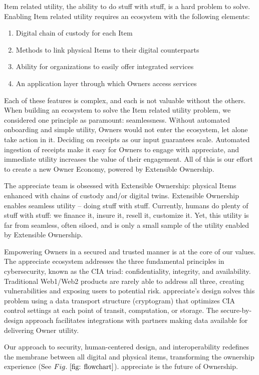 \documentclass[a4paper,onecolumn, 10.5pt]{article}
\begin{document}
Item related utility, the ability to do stuff with stuff, is a hard problem to solve. Enabling Item related utility requires an ecosystem with the following elements:
\begin{enumerate}
	\item Digital chain of custody for each Item
	\item Methods to link physical Items to their digital counterparts
	\item Ability for organizations to easily offer integrated services
	\item An application layer through which Owners access services
\end{enumerate}

Each of these features is complex, and each is not valuable without the others. When building an ecosystem to solve the Item related utility problem, we considered one principle as paramount: seamlessness. Without automated onboarding and simple utility, Owners would not enter the ecosystem, let alone take action in it. Deciding on receipts as our input guarantees scale. Automated ingestion of receipts make it easy for Owners to engage with appreciate, and immediate utility increases the value of their engagement. All of this is our effort to create a new Owner Economy, powered by Extensible Ownership.

The appreciate team is obsessed with Extensible Ownership: physical Items enhanced with chains of custody and/or digital twins. Extensible Ownership enables seamless utility -- doing stuff with stuff. 
Currently, humans do plenty of stuff with stuff: we finance it, insure it, resell it, customize it. 
Yet, this utility is far from seamless, often siloed, and is only a small sample of the utility enabled by Extensible Ownership. 

Empowering Owners in a secured and trusted manner is at the core of our values. The appreciate ecosystem addresses the three fundamental principles in cybersecurity, known as the CIA triad: confidentiality, integrity, and availability. 
Traditional Web1/Web2 products are rarely able to address all three, creating vulnerabilities and exposing users to potential risk. 
appreciate’s design solves this problem using a data transport structure (cryptogram) that optimizes CIA control settings at each point of transit, computation, or storage. 
The secure-by-design approach facilitates integrations with partners making data available for delivering Owner utility. 

Our approach to security, human-centered design, and interoperability redefines the membrane between all digital and physical items, transforming the ownership experience (See \(Fig.~\ref{fig: flowchart}\)).
appreciate is the future of Ownership.  
\end{document}
